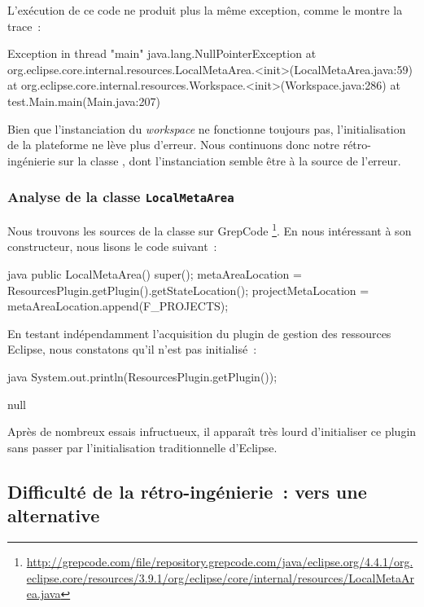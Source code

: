 L'exécution de ce code ne produit plus la même exception, comme le montre la trace~:

\begin{imtaConsole}
Exception in thread "main" java.lang.NullPointerException
	at org.eclipse.core.internal.resources.LocalMetaArea.<init>(LocalMetaArea.java:59)
	at org.eclipse.core.internal.resources.Workspace.<init>(Workspace.java:286)
	at test.Main.main(Main.java:207)
\end{imtaConsole}

Bien que l'instanciation du \textit{workspace} ne fonctionne toujours pas, l'initialisation de la plateforme ne lève plus d'erreur.
Nous continuons donc notre rétro-ingénierie sur la classe , dont l'instanciation semble être à la source de l'erreur.


\subsubsection{Analyse de la classe \texttt{LocalMetaArea}}

Nous trouvons les sources de la classe  sur GrepCode \footnote{%
\url{http://grepcode.com/file/repository.grepcode.com/java/eclipse.org/4.4.1/org.eclipse.core/resources/3.9.1/org/eclipse/core/internal/resources/LocalMetaArea.java}}.
En nous intéressant à son constructeur, nous lisons le code suivant~:

\begin{imtaCode}{java}
public LocalMetaArea() {
    super();
    metaAreaLocation = ResourcesPlugin.getPlugin().getStateLocation();
    projectMetaLocation = metaAreaLocation.append(F_PROJECTS);
}
\end{imtaCode}

En testant indépendamment l'acquisition du plugin de gestion des ressources Eclipse, nous constatons qu'il n'est pas initialisé~:

\begin{imtaCode}{java}
System.out.println(ResourcesPlugin.getPlugin());
\end{imtaCode}
\vspace{-0.5cm}
\begin{imtaConsole}
null
\end{imtaConsole}

Après de nombreux essais infructueux, il apparaît très lourd d'initialiser ce plugin sans passer par l'initialisation traditionnelle d'Eclipse.


\subsection{Difficulté de la rétro-ingénierie~: vers une alternative}

